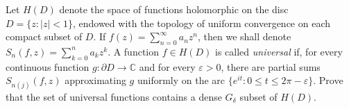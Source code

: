 Let $H(D)$ denote the space of functions holomorphic on the disc $D=\{ z\colon |z|<1 \}$, endowed with the topology of uniform convergence on each compact subset of $D$. If $f(z)=\sum_{n=0}^{\infty} a_nz^n$, then we shall denote $S_n(f,z)=\sum_{k=0}^n a_kz^k$. A function $f\in H(D)$ is called \textit{universal} if, for every continuous function $g\colon\partial D\rightarrow \mathbb{C}$ and for every $\varepsilon >0$, there are partial sums $S_{n(j)}(f,z)$ approximating $g$ uniformly on the arc $\{ e^{it} \colon 0\le t\le 2\pi - \varepsilon\}$. Prove that the set of universal functions contains a dense $G_{\delta}$ subset of $H(D)$.